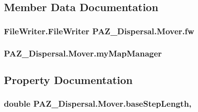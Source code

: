 \subsection{Member Data Documentation}
\hypertarget{class_p_a_z___dispersal_1_1_mover_a291435da8eb2172fd4e6378be81ea7a7}{
\subsubsection[{fw}]{\setlength{\rightskip}{0pt plus 5cm}File\-Writer.\-File\-Writer P\-A\-Z\-\_\-\-Dispersal.\-Mover.\-fw\hspace{0.3cm}{\ttfamily [protected]}}}\label{class_p_a_z___dispersal_1_1_mover_a291435da8eb2172fd4e6378be81ea7a7}
\hypertarget{class_p_a_z___dispersal_1_1_mover_a1fceb93669a9821630e1704c44f9e8fc}{
\subsubsection[{my\-Map\-Manager}]{ P\-A\-Z\-\_\-\-Dispersal.\-Mover.\-my\-Map\-Manager\hspace{0.3cm}{\ttfamily [protected]}}}\label{class_p_a_z___dispersal_1_1_mover_a1fceb93669a9821630e1704c44f9e8fc}


\subsection{Property Documentation}
\hypertarget{class_p_a_z___dispersal_1_1_mover_a198a0a67d6a01188ac3fac0720a14705}{
\subsubsection[{base\-Step\-Length}]{\setlength{\rightskip}{0pt plus 5cm}double P\-A\-Z\-\_\-\-Dispersal.\-Mover.\-base\-Step\-Length\hspace{0.3cm}{\ttfamily [get]}, {\ttfamily [set]}}}\label{class_p_a_z___dispersal_1_1_mover_a198a0a67d6a01188ac3fac0720a14705}


